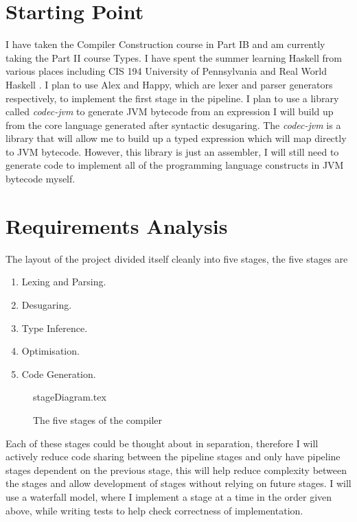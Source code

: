 \documentclass[float=false, crop=false]{standalone}
\begin{document}
\section{Starting Point}


  I have taken the Compiler Construction course in Part IB and am currently taking the Part II course Types. I have spent the summer
  learning Haskell from various places including CIS 194 University of Pennsylvania \cite{cis194} and Real World Haskell \cite{realworldhaskell}.
  I plan to use Alex and Happy, which are lexer and parser generators
  respectively, to implement the first stage in the pipeline.
  I plan to use a library called \textit{codec-jvm} to generate JVM bytecode from an expression I will build up from the core language generated after
  syntactic desugaring. The \textit{codec-jvm} is a library that will allow me to build up a typed expression which will map directly
  to JVM bytecode. However, this library is just an assembler, I will still need to generate code to implement all of the
  programming language constructs in JVM bytecode myself.

\section{Requirements Analysis}

The layout of the project divided itself cleanly into five stages, the five stages are
\begin{enumerate}
  \item Lexing and Parsing.
  \item Desugaring.
  \item Type Inference.
  \item Optimisation.
  \item Code Generation.
\end{enumerate}

\begin{figure}
  \centering
  {stageDiagram.tex}
  \caption{The five stages of the compiler}
\end{figure}

Each of these stages could be thought about in separation, therefore I will actively 
reduce code sharing between the pipeline stages and only have pipeline stages dependent 
on the previous stage, this will help reduce complexity between the stages and 
allow development of stages without relying on future 
stages. I will use a waterfall model, where I implement a stage
at a time in the order given above, while writing tests to help check
correctness of implementation.
\end{document}
